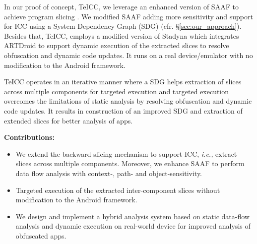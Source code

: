 In our proof of concept, TeICC, we leverage an enhanced version of SAAF to achieve program slicing \cite{hoffmann2013slicing}. We modified SAAF adding more sensitivity and support for ICC using a System Dependency Graph (SDG) (cfr. \S \ref{sec:our_approach}). Besides that, TeICC, employs a modified version of Stadyna \cite{zhauniarovich2015stadyna} which integrates ARTDroid \cite{costamagnaartdroid} to support dynamic execution of the extracted slices to resolve obfuscation and dynamic code updates. It runs on a real device/emulator with no modification to the Android framework.

TeICC operates in an iterative manner where a SDG helps extraction of slices across multiple components for targeted execution and targeted execution overcomes the limitations of static analysis by resolving obfuscation and dynamic code updates. It results in construction of an improved SDG and extraction of extended slices for better analysis of apps. 

\textbf{Contributions:}
\begin{itemize}
\item We extend the backward slicing mechanism to support ICC, \textit{i.e.,} extract slices across multiple components. Moreover, we enhance SAAF to perform data flow analysis with context-, path- and  object-sensitivity.

\item Targeted execution of the extracted inter-component slices without modification to the Android framework.

\item We design and implement a hybrid analysis system based on static data-flow analysis and dynamic execution on real-world device for improved analysis of obfuscated apps.
\end{itemize}
